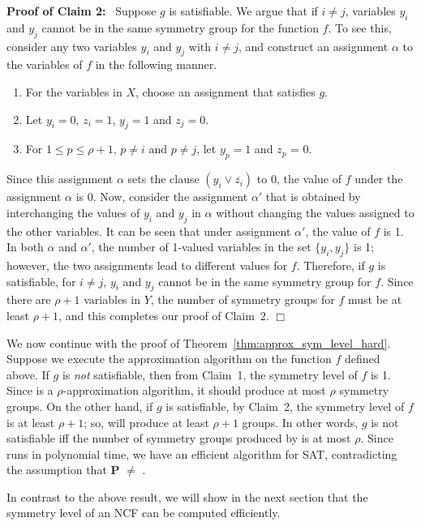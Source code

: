 \smallskip

\noindent
\textbf{Proof of Claim 2:}~ Suppose $g$ is satisfiable.
We argue that if $i \neq j$, variables $y_i$ and $y_j$
cannot be in the same symmetry group for the function $f$.
To see this, consider any two variables $y_i$ and $y_j$ with $i \neq j$,
and construct an assignment $\alpha$ to
the variables of $f$ in the following manner.
\begin{enumerate}
\item For the variables in $X$, choose an assignment that
satisfies $g$.
\item Let $y_i = 0$, $z_i = 1$, $y_j = 1$ and $z_j = 0$.
\item For $1 \leq p \leq \rho+1$, $p \neq i$ and $p \neq j$,
let $y_p = 1$ and $z_p$ = 0.
\end{enumerate}
Since this assignment $\alpha$ sets the clause $(y_i \vee \overline{z_i})$ to 0,
the value of $f$ under the assignment $\alpha$ is 0.
Now, consider the assignment $\alpha'$ that is obtained by interchanging
the values of $y_i$ and $y_j$ in $\alpha$ without changing the
values assigned to the other variables. 
It can be seen that under assignment $\alpha'$, the value of $f$ is 1.
In both $\alpha$ and $\alpha'$, the number of 1-valued variables in 
the set $\{y_i, y_j\}$ is 1; however, the two assignments lead to 
different values for $f$.
Therefore, if $g$ is satisfiable, for $i \neq j$, $y_i$ and $y_j$ cannot
be in the same symmetry group for $f$.
Since there are $\rho+1$ variables in $Y$, the number of symmetry groups 
for $f$ must be at least $\rho+1$, and this 
completes our proof of Claim~2. \hfill$\Box$

\medskip
 
We now continue with the proof of Theorem~\ref{thm:approx_sym_level_hard}.
Suppose we execute the approximation algorithm \cala{} 
on the function $f$ defined above.
If $g$ is \emph{not} satisfiable, then from Claim~1, 
the symmetry level of $f$ is 1. 
Since \cala{} is a $\rho$-approximation algorithm,
it should produce at most $\rho$ symmetry groups.
On the other hand, if $g$ is satisfiable, by Claim~2, the symmetry
level of $f$ is at least $\rho+1$; so, \cala{} will produce at least
$\rho+1$ groups.
In other words, $g$ is not satisfiable iff the number
of symmetry groups produced by \cala{} is at most $\rho$.
Since \cala{} runs in polynomial time, we have an efficient 
algorithm for SAT, contradicting the assumption that 
\textbf{P} $\neq$ \cnp.  \QED

\medskip

In contrast to the above result,
we will show in the next section that the symmetry level 
of an NCF can be computed efficiently.
